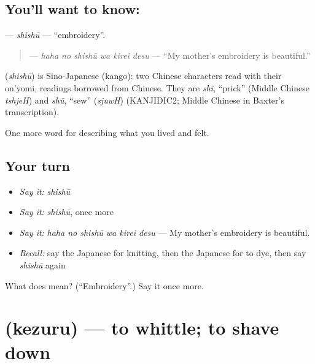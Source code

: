 \subsection*{You'll want to know: }
\textbf{} — \emph{shishū} — \textquotedblleft{}embroidery\textquotedblright{}.

\begin{quote}
\textbf{  } — \emph{haha no shishū wa kirei desu} — \textquotedblleft{}My mother's embroidery is beautiful.\textquotedblright{}
\end{quote}

\begin{cousinweb}
\textbf{} (\emph{shishū}) is Sino-Japanese (kango): two Chinese characters read with their on'yomi, readings borrowed from Chinese. They are \emph{shi}, \textquotedblleft{}prick\textquotedblright{} (Middle Chinese \emph{tshjeH}) and \emph{shū}, \textquotedblleft{}sew\textquotedblright{} (\emph{sjuwH}) (KANJIDIC2; Middle Chinese in Baxter's transcription).
\end{cousinweb}

\begin{grammarlens}[title={What you've built}]
One more word for describing what you lived and felt.
\end{grammarlens}

\subsection*{Your turn}
\begin{itemize}
\raggedright
  \item \emph{Say it:} \emph{shishū}
  \item \emph{Say it:} \emph{shishū}, once more
  \item \emph{Say it:} \emph{haha no shishū wa kirei desu} — My mother's embroidery is beautiful.
  \item \emph{Recall:} say the Japanese for knitting, then the Japanese for to dye, then say \emph{shishū} again
\end{itemize}

\begin{tcolorbox}[breakable,colback=teal!4,colframe=teal!35!black,title={Before you move on}]
What does  mean? (\textquotedblleft{}Embroidery\textquotedblright{}.) Say it once more.
\end{tcolorbox}
\section[\texorpdfstring{\ja{けずる} (kezuru)}{けずる (kezuru)}]{ (kezuru) — to whittle; to shave down}

